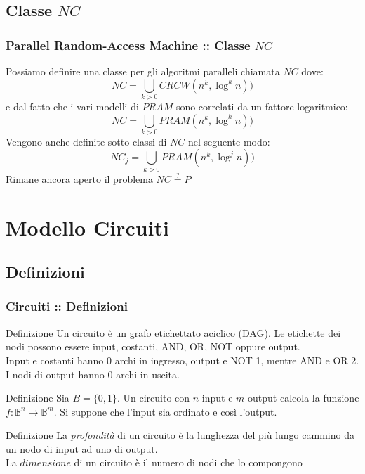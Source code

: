 \documentclass{beamer}
\begin{document}
\subsection{Classe $NC$}
\begin{frame}
	\frametitle{Parallel Random-Access Machine :: Classe $NC$} %
	Possiamo definire una classe per gli algoritmi paralleli chiamata $NC$ dove:
	\begin{equation}
		NC = \bigcup_{k>0} CRCW(n^k,\log^k n))
	\end{equation}
	e dal fatto che i vari modelli di $PRAM$ sono correlati da un fattore logaritmico: 
	\begin{equation}
	NC = \bigcup_{k>0} PRAM(n^k,\log^k n))
	\end{equation}
	Vengono anche definite sotto-classi di $NC$ nel seguente modo:
	\begin{equation}
	NC_j = \bigcup_{k>0} PRAM(n^k,\log^j n))
	\end{equation}
	Rimane ancora aperto il problema $NC \stackrel{?}{=} P$
	
\end{frame}


\section{Modello Circuiti}
\subsection{Definizioni}
\begin{frame}
	\frametitle{Circuiti :: Definizioni} %
	
	\begin{block}{Definizione}
		Un circuito è un grafo etichettato aciclico (DAG). Le etichette dei nodi possono essere input, costanti, AND, OR, NOT oppure output.\\ 
		Input e costanti hanno 0 archi in ingresso, output e NOT 1, mentre AND e OR 2. I nodi di output hanno 0 archi in uscita.
	\end{block}
	\begin{block}{Definizione}
		Sia $B = \{0,1\}$. Un circuito con $n$ input e $m$ output calcola la funzione $f\colon \mathbb{B}^n\to\mathbb{B}^m$. Si suppone che l'input sia ordinato e così l'output.
	\end{block}
	\begin{block}{Definizione}
		La \emph{profondità} di un circuito è la lunghezza del più lungo cammino da un nodo di input ad uno di output.\\
		La $dimensione$ di un circuito è il numero di nodi che lo compongono 
	\end{block}
	
\end{frame}
\end{document}
